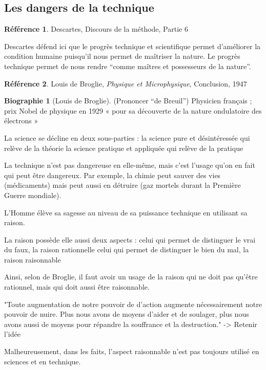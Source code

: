 \documentclass[french]{book}
\theoremstyle{definition}
\newtheorem*{refe}{Référence}
\newtheorem*{bio}{Biographie}
\begin{document}
\subsection{Les dangers de la technique}

\begin{refe}
	Descartes, Discours de la méthode, Partie 6
\end{refe}

Descartes défend ici que le progrès technique et scientifique permet d’améliorer la condition humaine puisqu'il nous permet de maîtriser la nature. Le progrès technique permet de nous rendre “comme maîtres et possesseurs de la nature”.

\begin{refe}
	Louis de Broglie, \textit{Physique et Microphysique}, Conclusion, 1947
\end{refe}

\begin{bio}[Louis de Broglie]
	(Prononcer “de Breuil”) Physicien français ; prix Nobel de physique en 1929 « pour sa découverte de la nature ondulatoire des électrons »
\end{bio}

La science se décline en deux sous-parties :
la science pure et désintéressée qui relève de la théorie
la science pratique et appliquée qui relève de la pratique

La technique n’est pas dangereuse en elle-même, mais c’est l’usage qu’on en fait qui peut être dangereux. Par exemple, la chimie peut sauver des vies (médicaments) mais peut aussi en détruire (gaz mortels durant la Première Guerre mondiale).

L’Homme élève sa sagesse au niveau de sa puissance technique en utilisant sa raison.

La raison possède elle aussi deux aspects :
celui qui permet de distinguer le vrai du faux, la raison rationnelle
celui qui permet de distinguer le bien du mal, la raison raisonnable

Ainsi, selon de Broglie, il faut avoir un usage de la raison qui ne doit pas qu'être rationnel, mais qui doit aussi être raisonnable.

"Toute augmentation de notre pouvoir de d’action augmente nécessairement notre pouvoir de nuire. Plus nous avons de moyens d’aider et de soulager, plus nous avons aussi de moyens pour répandre la souffrance et la destruction." -> Retenir l’idée

Malheureusement, dans les faits, l’aspect raisonnable n’est pas toujours utilisé en sciences et en technique.
\end{document}
